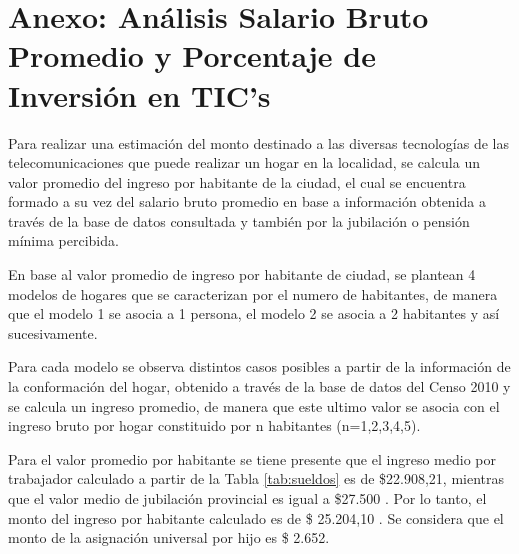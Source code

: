 \section{Anexo: Análisis Salario Bruto Promedio y Porcentaje de Inversión en TIC's}

Para realizar una estimación del monto destinado a las diversas tecnologías de las telecomunicaciones que puede realizar un hogar en la localidad, se calcula un valor promedio del ingreso por habitante de la ciudad, el cual se encuentra formado a su vez del salario  bruto promedio en base a información obtenida a través de la base de datos consultada \cite{base1} y también por la jubilación o pensión mínima percibida.

En base al valor promedio de ingreso por habitante de ciudad, se plantean 4 modelos de hogares que se caracterizan por el numero de habitantes, de manera que el modelo 1 se asocia a 1 persona, el modelo 2 se asocia a 2 habitantes y así sucesivamente.

Para cada modelo se observa distintos casos posibles a partir de la información de la conformación del hogar, obtenido a través de la base de datos del Censo 2010 y se calcula un ingreso promedio, de manera que este ultimo valor se asocia con el ingreso bruto por hogar constituido por n habitantes (n=1,2,3,4,5).

Para el valor promedio por habitante se tiene presente 
que el ingreso medio por trabajador calculado a partir de la Tabla \ref{tab:sueldos} es de \$22.908,21, mientras que el valor medio de jubilación provincial es igual a \$27.500  \cite{enl18}. Por lo tanto, el monto del ingreso por habitante calculado es de \$ 25.204,10 . Se considera que el monto de la asignación universal por hijo es \$ 2.652.



